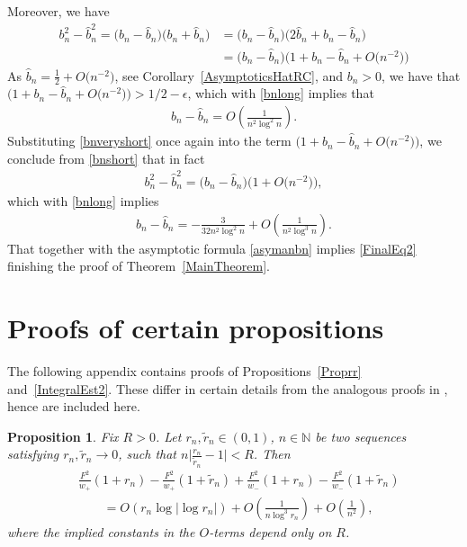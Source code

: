 \documentclass[11pt]{article}
\numberwithin{equation}{section}
\newcommand{\N}{\mathbb{N}}
\newtheorem{Proposition}[Theorem]{Proposition}
 { \theoremstyle{definition}
\newtheorem{Definition}[Theorem]{Definition}
\newtheorem{Note}[Theorem]{Note}
\newtheorem{Example}[Theorem]{Example}
\newtheorem{Remark}[Theorem]{Remark} }
\numberwithin{equation}{section}
\begin{document}
Moreover, we have
\begin{align}\nonumber
 b_n^2-\widehat b_n^2 = \big(b_n-\widehat b_n\big)\big(b_n+\widehat b_n\big) &= \big(b_n-\widehat b_n\big)\big(2\widehat b_n + b_n-\widehat b_n\big)
 \\\label{bnshort}
 &=\big(b_n-\widehat b_n\big)\big(1 + b_n-\widehat b_n + O\big(n^{-2}\big)\big)
\end{align}
As $\widehat b_n = \frac{1}{2} + O\big(n^{-2}\big)$, see Corollary~\ref{AsymptoticsHatRC}, and $b_n > 0$, we have that $\big(1 + b_n-\widehat b_n + O\big(n^{-2}\big)\big)>1/2-\epsilon$, which with \eqref{bnlong} implies that
\begin{align}\label{bnveryshort}
 b_n-\widehat b_n = O\left(\frac{1}{n^2\log^2 n}\right).
\end{align}
Substituting \eqref{bnveryshort} once again into the term $\big(1 + b_n-\widehat b_n + O\big(n^{-2}\big)\big)$, we conclude from \eqref{bnshort} that in fact
\begin{align*}
 b_n^2-\widehat b_n^2 = \big(b_n-\widehat b_n\big)\big(1+O\big(n^{-2}\big)\big),
\end{align*}
which with \eqref{bnlong} implies
\begin{align*}
 b_n-\widehat b_n = -\frac{3}{32n^2\log^2 n} + O\left(\frac{1}{n^2\log^3 n}\right).
\end{align*}
That together with the asymptotic formula \eqref{asymanbn} implies \eqref{FinalEq2} finishing the proof of Theorem~\ref{MainTheorem}.

\appendix
\section{Proofs of certain propositions}\label{appendixA}

The following appendix contains proofs of Propositions~\ref{Proprr} and~\ref{IntegralEst2}. These differ in certain details from the analogous proofs in \cite{CD}, hence are included here.
\begin{Proposition} \label{ProprrAp}
Fix $R > 0$. Let $r_n, \tilde r_n \in (0,1)$, $n \in \N$ be two sequences satisfying $r_n, \tilde r_n \to 0$, such that $n\big|\frac{r_n}{\tilde r_n}-1|< R$. Then
\begin{align*}%
 &\frac{F^2}{w_+}(1+r_n)-\frac{F^2}{w_+}(1+\tilde r_n)+\frac{F^2}{w_-}(1+r_n)-\frac{F^2}{w_-}(1+\tilde r_n)
 \\
 &\qquad= O(r_n \log |\log r_n|) + O\left(\frac{1}{n\log^3 r_n}\right) + O\left(\frac{1}{n^2}\right),
\end{align*}
where the implied constants in the $O$-terms depend only on $R$.
\end{Proposition}
\end{document}
